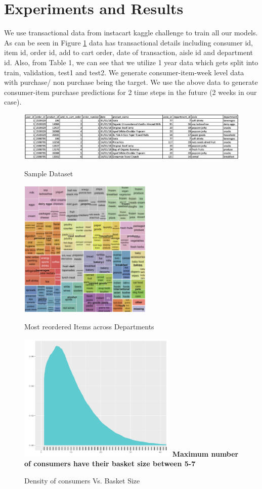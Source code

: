 \section{Experiments and Results}
\label{sec:eval}
We use transactional data from instacart kaggle challenge \cite{data} to train all our models. As can 
be seen in Figure \ref{fig:sampledata} data has transactional details including consumer id, item id, 
order id, add to cart order, date of transaction, aisle id and department id.
Also, from Table 1, we can see that we utilize 1 year data which gets split into train, validation,
test1 and test2. We generate consumer-item-week level data with purchase/ non purchase being the target.
We use the above data to generate consumer-item purchase predictions for 2 time steps in the future (2 weeks in our case).
 \begin{figure}[!t]
    \centering 
    \caption{Sample Dataset} 
    \includegraphics[width=6.6in]{img/sampledata.png} 
    \label{fig:sampledata} 
  \end{figure}

  \begin{figure}[t]
    \centering 
    \caption{Most reordered Items across Departments} 
    \includegraphics[width=2.5in]{img/items.png} 
    \label{fig:items} 
  \end{figure}

  \begin{figure}[t]
    \centering 
    \caption{Density of consumers Vs. Basket Size} 
    \includegraphics[width=3in]{img/basket.png} 
    {\bf Maximum number of consumers have their basket size between 5-7}
    \label{fig:basket} 
  \end{figure}

